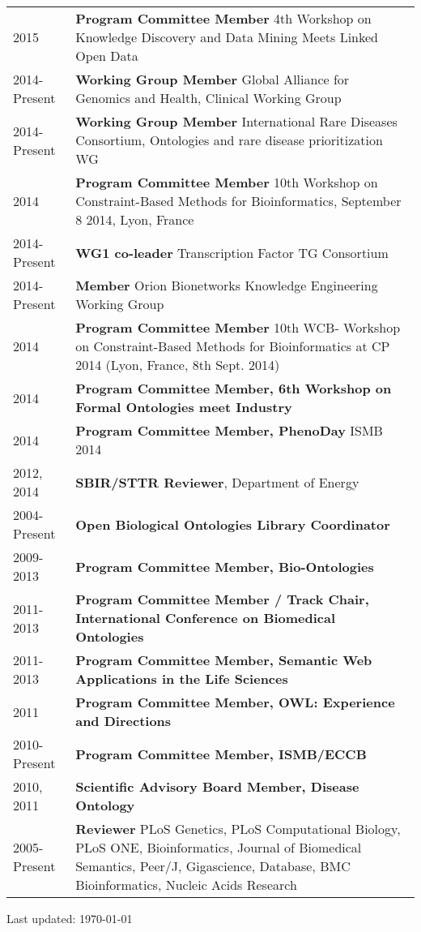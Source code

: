 \documentclass[11pt,fullpage]{article}
\begin{document}
\begin{longtable}{p{0.5in}|p{5.5in}}

2015  & \textbf{Program Committee Member}  4th Workshop on Knowledge Discovery and Data Mining Meets Linked Open Data \\
2014-Present  & \textbf{Working Group Member}  Global Alliance for Genomics and Health, Clinical Working Group \\
2014-Present  & \textbf{Working Group Member}  International Rare Diseases Consortium, Ontologies and rare disease prioritization WG \\
2014  & \textbf{Program Committee Member}  10th Workshop on Constraint-Based Methods for Bioinformatics, September 8 2014, Lyon, France \\
2014-Present  & \textbf{WG1 co-leader} Transcription Factor TG Consortium \\
2014-Present  & \textbf{Member} Orion Bionetworks Knowledge Engineering Working Group \\
2014 & \textbf{Program Committee Member} 10th WCB- Workshop on Constraint-Based Methods for Bioinformatics at CP 2014 (Lyon, France, 8th Sept. 2014) \\
2014 & \textbf{Program Committee Member, 6th Workshop on Formal Ontologies meet Industry}\\
2014 & \textbf{Program Committee Member, PhenoDay} ISMB 2014\\
2012, 2014 & \textbf{SBIR/STTR Reviewer}, Department of Energy \\
2004-Present  & \textbf{Open Biological Ontologies Library Coordinator} \\
2009-2013  & \textbf{Program Committee Member, Bio-Ontologies} \\
2011-2013 & \textbf{Program Committee Member / Track Chair, International Conference on Biomedical Ontologies}\\
2011-2013 & \textbf{Program Committee Member, Semantic Web  Applications in the Life Sciences}\\
2011 & \textbf{Program Committee Member, OWL: Experience and Directions} \\
2010-Present & \textbf{Program Committee Member, ISMB/ECCB} \\
2010, 2011 & \textbf{Scientific Advisory Board Member, Disease Ontology} \\
2005-Present  & \textbf{Reviewer} PLoS Genetics, PLoS Computational
Biology, PLoS ONE, Bioinformatics, Journal of Biomedical
Semantics, Peer/J, Gigascience, Database, BMC Bioinformatics, Nucleic Acids Research\\

\end{longtable}







\bigskip
\begin{center}
  \begin{footnotesize}
    Last updated: \today
  \end{footnotesize}
\end{center}



\end{document}
